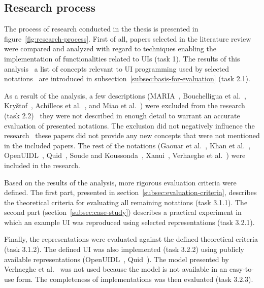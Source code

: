 \subsection{Research process}\label{subsec:research-process}

The process of research conducted in the thesis is presented in figure~\ref{fig:research-process}.
First of all, papers selected in the literature review were compared and analyzed with regard to techniques enabling the implementation of functionalities related to UIs (task 1).
The results of this analysis \textendash\ a list of concepts relevant to UI programming used by selected notations \textendash\ are introduced in subsection~\ref{subsec:basis-for-evaluation} (task 2.1).

As a result of the analysis, a few descriptions (MARIA~\cite{Paterno2009, MariaPDF}, Bouchelligua et al.~\cite{Bouchelligua2010}, Kryštof~\cite{kryvstof2010lpgm}, Achilleos et al.~\cite{Achilleos2011}, and Miao et al.~\cite{Miao2017}) were excluded from the research (task 2.2) \textendash\ they were not described in enough detail to warrant an accurate evaluation of presented notations.
The exclusion did not negatively influence the research \textendash\ these papers did not provide any new concepts that were not mentioned in the included papers.
The rest of the notations (Gaouar et al.~\cite{Gaouar2018}, Khan et al.~\cite{Khan2021}, OpenUIDL~\cite{Moldovan2020}, Quid~\cite{molina2018quid, Molina2019}, Soude and Koussonda~\cite{Soude2022}, Xanui~\cite{hermida2016xanui}, Verhaeghe et al.~\cite{Verhaeghe2021visual, Verhaeghe2021behavior}) were included in the research.

Based on the results of the analysis, more rigorous evaluation criteria were defined.
The first part, presented in section~\ref{subsec:evaluation-criteria}, describes the theoretical criteria for evaluating all remaining notations (task 3.1.1).
The second part (section~\ref{subsec:case-study}) describes a practical experiment in which an example UI was reproduced using selected representations (task 3.2.1).

Finally, the representations were evaluated against the defined theoretical criteria (task 3.1.2).
The defined UI was also implemented (task 3.2.2) using publicly available representations (OpenUIDL~\cite{Moldovan2020}, Quid~\cite{molina2018quid, Molina2019}).
The model presented by Verhaeghe et al.~\cite{Verhaeghe2021visual, Verhaeghe2021behavior} was not used because the model is not available in an easy-to-use form.
The completeness of implementations was then evaluated (task 3.2.3).

